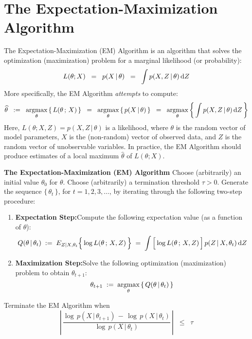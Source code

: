 \section{The Expectation-Maximization Algorithm}
\setcounter{theorem}{0}
\setcounter{equation}{0}


The Expectation-Maximization (EM) Algorithm is an algorithm that solves the optimization
(maximization) problem for a marginal likelihood (or probability):
\begin{equation*}
L(\theta;X) \;\; = \;\; p(X\,|\,\theta) \;\; = \;\; \int p(X,Z\,|\,\theta) \,\textnormal{d}Z
\end{equation*}
More specifically, the EM Algorithm \textit{attempts} to compute:
\begin{equation*}
\widehat{\theta}
\;\; := \;\;
\underset{\theta}{\textnormal{argmax}}\left\{\,L(\theta\,;\,X)\,\right\}
\;\; = \;\;
\underset{\theta}{\textnormal{argmax}}\left\{\,p(X\,|\,\theta)\,\right\}
\;\; = \;\;
\underset{\theta}{\textnormal{argmax}}\left\{\,\int p(X,Z\,|\,\theta) \,\textnormal{d}Z\,\right\}
\end{equation*}
Here, $L(\theta;X,Z) = p(X,Z\,|\,\theta)$ is a likelihood, where $\theta$ is the random vector of model
parameters, $X$ is the (non-random) vector of observed data, and $Z$ is the random vector of
unobservable variables.
In practice, the EM Algorithm should produce estimates of a local maximum $\widehat{\theta}$ of $L(\theta;X)$.

\vskip 1.0cm
\noindent
\textbf{The Expectation-Maximization (EM) Algorithm}
\vskip 0.3cm
\noindent
Choose (arbitrarily) an initial value $\theta_{0}$ for $\theta$.
Choose (arbitrarily) a termination threshold $\tau > 0$.
Generate the sequence $\{\,\theta_{t}\,\}$, for $t = 1, 2, 3, \ldots$, by iterating through the following
two-step procedure:
\begin{enumerate}
\item	\textbf{Expectation Step:}\quad Compute the following expectation value (as a function of $\theta$):
		\begin{equation}
		\label{EM:ExpectationStep}
		Q(\theta\,|\,\theta_{t})
		\; := \;
		E_{Z|X,\theta_{t}}\!\left\{\,\overset{{\color{white}.}}{\log}\,L(\theta\,;\,X,Z)\,\right\}
		\; = \;
		\int \left[\,\overset{{\color{white}.}}{\log}\,L(\theta\,;\,X,Z)\,\right] p(Z\,|\,X,\theta_{t})\,\textnormal{d}Z
		\end{equation}
\item	\textbf{Maximization Step:}\quad Solve the following optimization (maximization) problem to obtain
		$\theta_{t+1}$:
		\begin{equation}
		\label{EM:MaximizationStep}
		\theta_{t+1} \; := \;
		\underset{\theta}{\textnormal{argmax}}\left\{\,Q(\theta\,|\,\theta_{t})\,\right\}
		\end{equation}
\end{enumerate}
Terminate the EM Algorithm when
\begin{equation}
\label{EM:terminationCriterion}
\left\vert\,\dfrac{\log\,p(X\,|\,\theta_{t+1})\,-\,\log\,p(X\,|\,\theta_{t})}{\log\,p(X\,|\,\theta_{t})}\,\right\vert
\;\; \leq \;\; \tau
\end{equation}
\vskip 1.0cm

